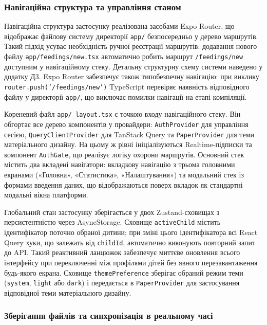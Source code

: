 \subsubsection{Навігаційна структура та управління станом}

Навігаційна структура застосунку реалізована засобами Expo Router, що відображає файлову систему директорії \texttt{app/} безпосередньо у дерево маршрутів. Такий підхід усуває необхідність ручної реєстрації маршрутів: додавання нового файлу \texttt{app/feedings/new.tsx} автоматично робить маршрут \texttt{/feedings/new} доступним у навігаційному стеку. Детальну структурну схему системи наведено у додатку Д3. Expo Router забезпечує також типобезпечну навігацію: при виклику \texttt{router.push('/feedings/new')} TypeScript перевіряє наявність відповідного файлу у директорії \texttt{app/}, що виключає помилки навігації на етапі компіляції.

Кореневий файл \texttt{app/\_layout.tsx} є точкою входу навігаційного стеку. Він обгортає все дерево компонентів у провайдери: \texttt{AuthProvider} для управління сесією, \texttt{QueryClientProvider} для TanStack Query та \texttt{PaperProvider} для теми матеріального дизайну. На цьому ж рівні ініціалізуються Realtime-підписки та компонент \texttt{AuthGate}, що реалізує логіку охорони маршрутів. Основний стек містить два вкладені навігатори: вкладкову навігацію з трьома головними екранами («Головна», «Статистика», «Налаштування») та модальний стек із формами введення даних, що відображаються поверх вкладок як стандартні модальні вікна платформи.

Глобальний стан застосунку зберігається у двох Zustand-сховищах з персистентністю через AsyncStorage. Сховище \texttt{activeChild} містить ідентифікатор поточно обраної дитини; при зміні цього ідентифікатора всі React Query хуки, що залежать від \texttt{childId}, автоматично виконують повторний запит до \gls{API}. Такий реактивний ланцюжок забезпечує миттєве оновлення всього інтерфейсу при переключенні між профілями дітей без явного перезавантаження будь-якого екрана. Сховище \texttt{themePreference} зберігає обраний режим теми (\texttt{system}, \texttt{light} або \texttt{dark}) і передається в \texttt{PaperProvider} для застосування відповідної теми матеріального дизайну.

\subsubsection{Зберігання файлів та синхронізація в реальному часі}
\label{sec:realtime}

